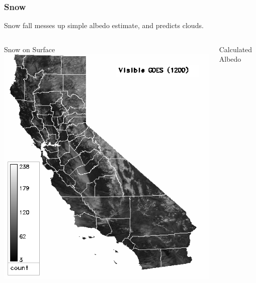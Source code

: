 \documentclass{beamer}
\begin{document}
\begin{frame}
  \frametitle{Snow}

  \begin{block}{}
    Snow fall messes up simple albedo estimate, and predicts clouds.
  \end{block}

  \begin{columns}
    \begin{block}{Snow on Surface}
      \includegraphics[width=1\textwidth]{2005-01-06/vis1200.png}
    \end{block}
    \begin{block}{Calculated Albedo}

\end{block}
\end{columns}
\end{frame}
\end{document}
